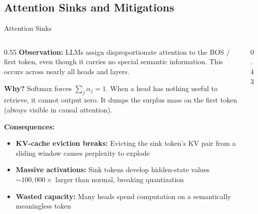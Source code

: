 \subsection{Attention Sinks and Mitigations}

\begin{frame}{Attention Sinks~\cite{xiao2024streamingllm}}

  \begin{columns}[T]
    \begin{column}{0.55\textwidth}
      \textbf{Observation:} LLMs assign disproportionate attention to the BOS / first token,
      even though it carries no special semantic information. This occurs across nearly all heads and layers.

      \vspace{0.3em}
      \textbf{Why?} Softmax forces $\sum_j \alpha_j = 1$.
      When a head has nothing useful to retrieve, it cannot output zero.
      It dumps the surplus mass on the first token (always visible in causal attention).

      \vspace{0.3em}
      \textbf{Consequences:}
      \begin{itemize}
        \item \textbf{KV-cache eviction breaks:} Evicting the sink token's KV pair from a sliding window causes perplexity to explode
        \item \textbf{Massive activations:} Sink tokens develop hidden-state values $\sim\!100{,}000\times$ larger than normal, breaking quantization
        \item \textbf{Wasted capacity:} Many heads spend computation on a semantically meaningless token
      \end{itemize}
    \end{column}
    \begin{column}{0.43\textwidth}
      \centering
\end{column}
\end{columns}
\end{frame}
